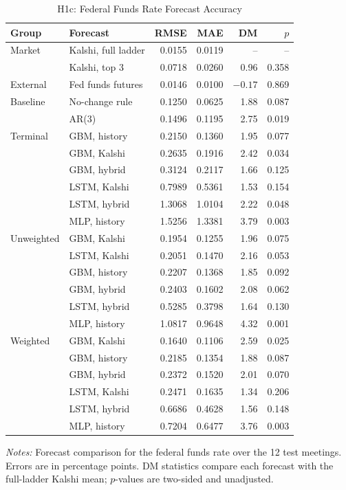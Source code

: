 \documentclass[12pt,a4paper]{report}
\newcommand{\tablenote}[1]{%
  \par\vspace{0.4em}%
  \begin{minipage}{0.9\textwidth}%
  \footnotesize\raggedright\emph{Notes:} #1%
  \end{minipage}%
}
\begin{document}
\begin{table}[H]
\centering
\caption{H1c: Federal Funds Rate Forecast Accuracy}
\label{tab:h1c-ffr}
\footnotesize
\begin{tabular}{@{}llrrrr@{}}
\toprule
Group & Forecast & RMSE & MAE & DM & $p$ \\
\midrule
Market & Kalshi, full ladder & 0.0155 & 0.0119 & -- & -- \\
 & Kalshi, top 3 & 0.0718 & 0.0260 & 0.96 & 0.358 \\
\midrule
External & Fed funds futures & 0.0146 & 0.0100 & $-0.17$ & 0.869 \\
\midrule
Baseline & No-change rule & 0.1250 & 0.0625 & 1.88 & 0.087 \\
 & AR(3) & 0.1496 & 0.1195 & 2.75 & 0.019 \\
\midrule
Terminal & GBM, history & 0.2150 & 0.1360 & 1.95 & 0.077 \\
 & GBM, Kalshi & 0.2635 & 0.1916 & 2.42 & 0.034 \\
 & GBM, hybrid & 0.3124 & 0.2117 & 1.66 & 0.125 \\
 & LSTM, Kalshi & 0.7989 & 0.5361 & 1.53 & 0.154 \\
 & LSTM, hybrid & 1.3068 & 1.0104 & 2.22 & 0.048 \\
 & MLP, history & 1.5256 & 1.3381 & 3.79 & 0.003 \\
\midrule
Unweighted & GBM, Kalshi & 0.1954 & 0.1255 & 1.96 & 0.075 \\
 & LSTM, Kalshi & 0.2051 & 0.1470 & 2.16 & 0.053 \\
 & GBM, history & 0.2207 & 0.1368 & 1.85 & 0.092 \\
 & GBM, hybrid & 0.2403 & 0.1602 & 2.08 & 0.062 \\
 & LSTM, hybrid & 0.5285 & 0.3798 & 1.64 & 0.130 \\
 & MLP, history & 1.0817 & 0.9648 & 4.32 & 0.001 \\
\midrule
Weighted & GBM, Kalshi & 0.1640 & 0.1106 & 2.59 & 0.025 \\
 & GBM, history & 0.2185 & 0.1354 & 1.88 & 0.087 \\
 & GBM, hybrid & 0.2372 & 0.1520 & 2.01 & 0.070 \\
 & LSTM, Kalshi & 0.2471 & 0.1635 & 1.34 & 0.206 \\
 & LSTM, hybrid & 0.6686 & 0.4628 & 1.56 & 0.148 \\
 & MLP, history & 0.7204 & 0.6477 & 3.76 & 0.003 \\
\bottomrule
\end{tabular}
\tablenote{Forecast comparison for the federal funds rate over the 12 test
meetings. Errors are in percentage points. DM statistics compare each forecast
with the full-ladder Kalshi mean; $p$-values are two-sided and unadjusted.}
\end{table}
\end{document}

